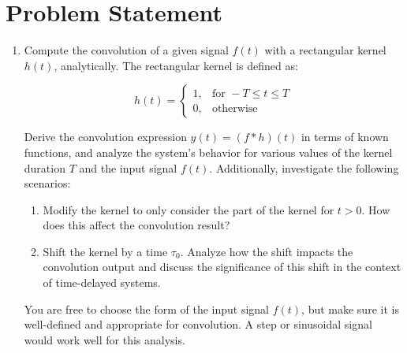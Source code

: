 \documentclass[12pt]{article}
\begin{document}
\section{Problem Statement}
\begin{enumerate}
\item Compute the convolution of a given signal $f(t)$ with a rectangular kernel $h(t)$, analytically. The rectangular kernel is defined as:

\begin{equation}
h(t) =
\begin{cases}
1, & \text{for } -T \leq t \leq T \\
0, & \text{otherwise}
\end{cases}
\end{equation}

Derive the convolution expression $y(t) = (f * h)(t)$ in terms of known functions, and analyze the system's behavior for various values of the kernel duration $T$ and the input signal $f(t)$. Additionally, investigate the following scenarios:

\begin{enumerate}
\item Modify the kernel to only consider the part of the kernel for $t > 0$. How does this affect the convolution result?

\item Shift the kernel by a time $\tau_0$. Analyze how the shift impacts the convolution output and discuss the significance of this shift in the context of time-delayed systems.
\end{enumerate}

You are free to choose the form of the input signal $f(t)$, but make sure it is well-defined and appropriate for convolution. A step or sinusoidal signal would work well for this analysis.
\end{enumerate}







\end{document}
